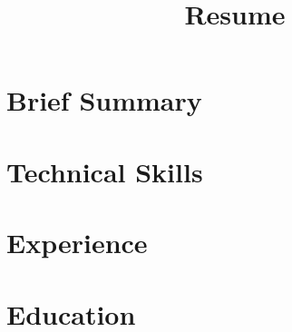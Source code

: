 \documentclass[10pt,a4paper]{article}
\begin{document}
\title{Resume}


\part{Brief Summary}


\part{Technical Skills}


\part{Experience}


\part{Education}

\end{document}
